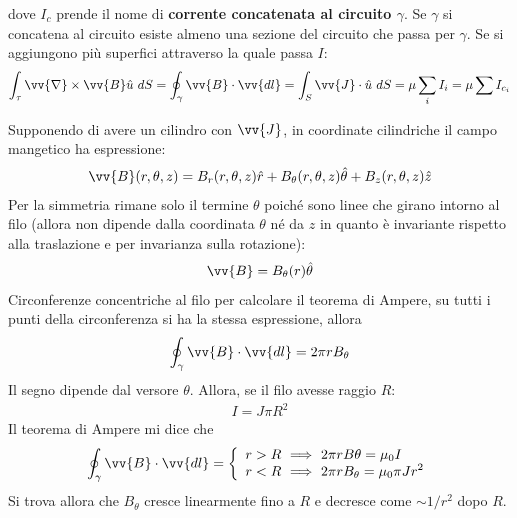 \documentclass[a4paper, oneside]{article}
\begin{document}
dove $I_c$ prende il nome di \textbf{corrente concatenata al circuito $\gamma$}. Se $\gamma$
si concatena al circuito esiste almeno una sezione del circuito che passa per $\gamma$. Se si aggiungono 
più superfici attraverso la quale passa $I$: 
\begin{align}
        \int_{\tau} \vv{\nabla} \times \vv{B} \hat{u} \ dS = \oint_\gamma \vv{B} \cdot \vv{dl}  =     \int_{S} \vv{J} \cdot \hat{u} \ dS = \mu \sum_i I_i = \mu \sum I_{c_i}
\end{align}
\begin{example}
    Supponendo di avere un cilindro con $\vv{J}$, in coordinate
    cilindriche il campo mangetico ha espressione:
    \begin{align}
        \vv{B}(r, \theta, z) = B_r(r, \theta, z) \hat{r}  +  B_\theta(r, \theta, z) \hat{\theta}+  B_z(r, \theta, z) \hat{z}
    \end{align} 
    Per la simmetria rimane solo il termine $\theta$ poiché sono linee che girano intorno 
    al filo (allora non dipende dalla coordinata $\theta$ né da $z$ in quanto è invariante 
    rispetto alla traslazione e per invarianza sulla rotazione):
    \begin{gather*}
        \vv{B} = B_\theta(r) \hat{\theta}  
    \end{gather*}
    Circonferenze concentriche al filo per calcolare il teorema di Ampere, 
    su tutti i punti della circonferenza si ha la stessa espressione, allora 
    \begin{gather*}
        \oint_\gamma \vv{B} \cdot \vv{dl} = 2\pi r B_\theta  
    \end{gather*}
    Il segno dipende dal versore $\theta$. Allora, se il filo avesse 
    raggio $R$:
    \begin{gather*}
        I = J\pi R^{2}
    \end{gather*}
    Il teorema di Ampere mi dice che
    \begin{gather*}
        \oint_\gamma \vv{B} \cdot \vv{dl} = \left\{\begin{array}{l}
            \displaystyle r > R \ \Longrightarrow \ 2\pi rB\theta = \mu_0 I \\
            \displaystyle r < R \ \Longrightarrow \ 2\pi rB_\theta = \mu_0\pi J r^{2} 
        \end{array}\right.  
    \end{gather*}
    Si trova allora che $B_\theta$ cresce linearmente fino a $R$ e decresce 
    come $\sim 1 /r^{2}$ dopo $R$.
\end{example}
\end{document}
